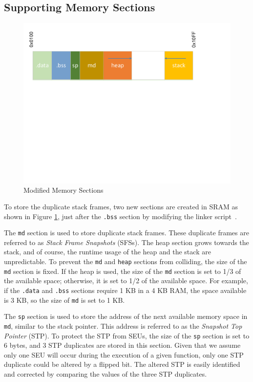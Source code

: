 \subsection{Supporting Memory Sections}\label{sec:memory_sections}
\vspace{-15pt}
\begin{figure}
\centering
\includegraphics[scale=0.35]{figures/modified_memory_model.pdf}
\vspace{-5pt}
\caption{Modified Memory Sections}
\label{fig:modified_ram_map}
\end{figure}
\vspace{-15pt}
To store the duplicate stack frames, two new sections are created in SRAM as shown in Figure \ref{fig:modified_ram_map}, just after the \texttt{.bss} section by modifying the linker script~\cite{linkerscript}. 

The \texttt{md} section is used to store duplicate stack frames. These duplicate frames are referred to as \textit{Stack Frame Snapshots} (SFSs). The heap section grows towards the stack, and of course, the runtime usage of the heap and the stack are unpredictable. To prevent the \texttt{md} and \texttt{heap} sections from colliding, the size of the \texttt{md} section is fixed. If the heap is used, the size of the \texttt{md} section is set to 1/3 of the available space; otherwise, it is set to 1/2 of the available space. For example, if the \texttt{.data} and \texttt{.bss} sections require 1 KB in a 4 KB RAM, the space available is 3 KB, so the size of \texttt{md} is set to 1 KB.

The \texttt{sp} section is used to store the address of the next available memory space in \texttt{md}, similar to the stack pointer. This address is referred to as the \textit{Snapshot Top Pointer} (STP). To protect the STP from SEUs, the size of the \texttt{sp} section is set to 6 bytes, and 3 STP duplicates are stored in this section. Given that we assume only one SEU will occur during the execution of a given function, only one STP duplicate could be altered by a flipped bit. The altered STP is easily identified and corrected by comparing the values of the three STP duplicates.
\vspace{-15pt}

